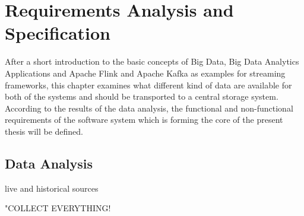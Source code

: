\chapter{Requirements Analysis and Specification}

After a short introduction to the basic concepts of Big Data, Big Data Analytics Applications
and Apache Flink and Apache Kafka as examples for streaming frameworks, this chapter
examines what different kind of data are available  for both of the systems and should be
transported to a central storage system. According to the results of the data analysis, the
functional and non-functional requirements of the software system which is forming the core of
the present thesis will be defined.

\section{Data Analysis}

live and historical sources

"COLLECT EVERYTHING!

%
%
%
%
%

